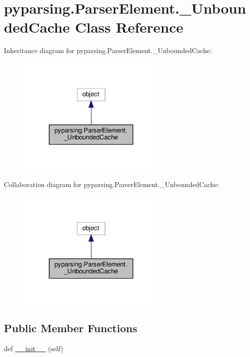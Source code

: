 \hypertarget{classpyparsing_1_1ParserElement_1_1__UnboundedCache}{}\section{pyparsing.\+Parser\+Element.\+\_\+\+Unbounded\+Cache Class Reference}
\label{classpyparsing_1_1ParserElement_1_1__UnboundedCache}


Inheritance diagram for pyparsing.\+Parser\+Element.\+\_\+\+Unbounded\+Cache\+:
\nopagebreak
\begin{figure}[H]
\begin{center}
\leavevmode
\includegraphics[width=209pt]{classpyparsing_1_1ParserElement_1_1__UnboundedCache__inherit__graph}
\end{center}
\end{figure}


Collaboration diagram for pyparsing.\+Parser\+Element.\+\_\+\+Unbounded\+Cache\+:
\nopagebreak
\begin{figure}[H]
\begin{center}
\leavevmode
\includegraphics[width=209pt]{classpyparsing_1_1ParserElement_1_1__UnboundedCache__coll__graph}
\end{center}
\end{figure}
\subsection*{Public Member Functions}
\begin{DoxyCompactItemize}
\item 
def \hyperlink{classpyparsing_1_1ParserElement_1_1__UnboundedCache_ace4deeb95c5fddd9c8674d9340ba2a78}{\+\_\+\+\_\+init\+\_\+\+\_\+} (self)
\end{DoxyCompactItemize}
